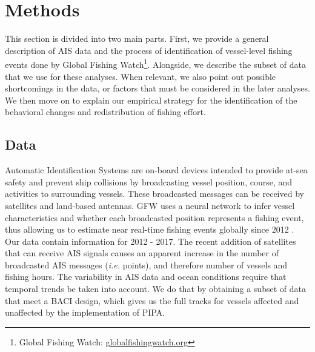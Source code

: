 \documentclass[11pt,]{article}
\let\rmarkdownfootnote\footnote%
\def\footnote{\protect\rmarkdownfootnote}
\begin{document}
\hypertarget{methods}{%
\section{Methods}\label{methods}}

This section is divided into two main parts. First, we provide a general
description of AIS data and the process of identification of
vessel-level fishing events done by Global Fishing Watch\footnote{Global
  Fishing Watch: \url{globalfishingwatch.org}}. Alongside, we describe
the subset of data that we use for these analyses. When relevant, we
also point out possible shortcomings in the data, or factors that must
be considered in the later analyses. We then move on to explain our
empirical strategy for the identification of the behavioral changes and
redistribution of fishing effort.

\hypertarget{data}{%
\subsection{Data}\label{data}}

Automatic Identification Systems are on-board devices intended to
provide at-sea safety and prevent ship collisions by broadcasting vessel
position, course, and activities to surrounding vessels. These
broadcasted messages can be received by satellites and land-based
antennas. GFW uses a neural network to infer vessel characteristics and
whether each broadcasted position represents a fishing event, thus
allowing us to estimate near real-time fishing events globally since
2012 \citep{kroodsma_2018}. Our data contain information for 2012 -
2017. The recent addition of satellites that can receive AIS signals
causes an apparent increase in the number of broadcasted AIS messages
(\emph{i.e.} points), and therefore number of vessels and fishing hours.
The variability in AIS data and ocean conditions require that temporal
trends be taken into account. We do that by obtaining a subset of data
that meet a BACI design, which gives us the full tracks for vessels
affected and unaffected by the implementation of PIPA.
\end{document}
